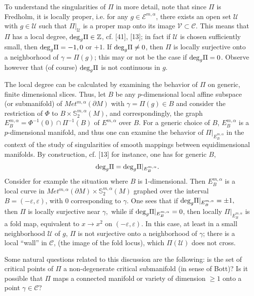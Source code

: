 \documentclass[11pt,amsfonts]{amsart}
\begin{document}
  To understand the singularities of $\Pi$ in more detail, 
note that since $\Pi$ is Fredholm, it is locally proper, i.e. 
for any $g\in{\mathcal E}^{m,\alpha}$, there exists an open set ${\mathcal U}$ 
with $g\in{\mathcal U}$ such that $\Pi|_{{\mathcal U}}$ is a proper map onto 
its image ${\mathcal V} \subset {\mathcal C}$. This means that $\Pi$ has a 
local degree, ${\rm deg}_{g}\Pi \in {\mathbb Z}$, cf. [41], [13]; in fact if 
${\mathcal U}$ is chosen sufficiently small, then ${\rm deg}_{g}\Pi = -1, 0$ 
or $+1$. If ${\rm deg}_{g}\Pi \neq 0$, then $\Pi$ is locally surjective onto 
a neighborhood of $\gamma  = \Pi(g)$; this may or not be the case if 
${\rm deg}_{g}\Pi= 0$. Observe however that (of course) ${\rm deg}_{g}\Pi$ 
is not continuous in $g$. 

 The local degree can be calculated by examining the behavior of $\Pi$ 
on generic, finite dimensional slices. Thus, let $B$ be any 
$p$-dimensional local affine subspace (or submanifold) of 
$Met^{m,\alpha}(\partial M)$ with $\gamma  = \Pi(g) \in  B$ and 
consider the restriction of $\Phi$ to $B\times {\mathbb S}_{2}^{m,\alpha}(M)$, 
and correspondingly, the graph $E_{B}^{m,\alpha} = 
\Phi^{-1}(0)\cap\Pi^{-1}(B)$ of $E^{m,\alpha}$ over $B$. For a generic 
choice of $B$, $E_{B}^{m,\alpha}$ is a $p$-dimensional manifold, and thus 
one can examine the behavior of $\Pi|_{E_{B}^{m,\alpha}}$ in the 
context of the study of singularities of smooth mappings between 
equidimensional manifolds. By construction, cf. [13] for instance, one 
has for generic $B$, 
$${\rm deg}_{g}\Pi = {\rm deg}_{g}\Pi|_{E_{B}^{m,\alpha}}. $$
Consider for example the situation where $B$ is 1-dimensional. Then 
$E_{B}^{m,\alpha}$ is a local curve in $Met^{m,\alpha}(\partial M)\times 
{\mathbb S}_{2}^{m,\alpha}(M)$ graphed over the interval 
$B = (-\varepsilon ,\varepsilon)$, with 0 corresponding to $\gamma$. 
One sees that if ${\rm deg}_{g}\Pi|_{E_{B}^{m,\alpha}} = \pm 1,$ then 
$\Pi$ is locally surjective near $\gamma ,$ while if 
${\rm deg}_{g}\Pi|_{E_{B}^{m,\alpha}} = 0$, then locally 
$\Pi|_{E_{B}^{m,\alpha}}$ is a fold map, equivalent to 
$x \rightarrow  x^{2}$ on $(-\varepsilon , \varepsilon)$. In this case, at 
least in a small neighborhood ${\mathcal U}$ of $g$, $\Pi$ is not 
surjective onto a neighborhood of $\gamma$; there is a local ``wall'' in 
${\mathcal C}$, (the image of the fold locus), which $\Pi({\mathcal U})$ 
does not cross. 

 Some natural questions related to this discussion are the following: 
is the set of critical points of $\Pi$ a non-degenerate critical 
submanifold (in sense of Bott)? Is it possible that $\Pi$ maps a 
connected manifold or variety of dimension $\geq 1$ onto a point 
$\gamma\in{\mathcal C}$? 
\end{document}
